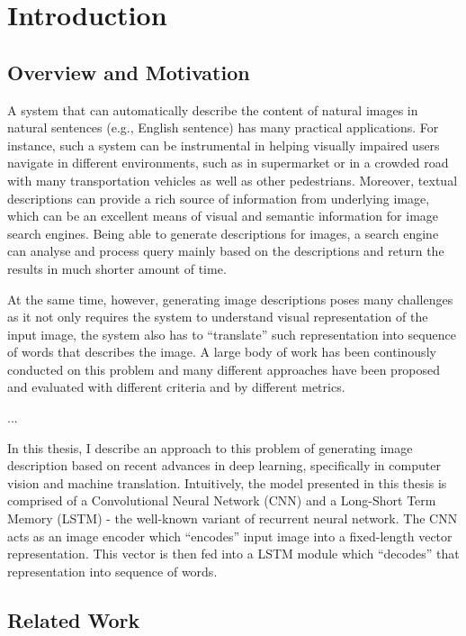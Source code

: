 \chapter{Introduction}

\section{Overview and Motivation}
A system that can automatically describe the content of natural images in natural sentences (e.g., English sentence) has many practical applications. For instance, such a system can be instrumental in helping visually impaired users navigate in different environments, such as in supermarket or in a crowded road with many transportation vehicles as well as other pedestrians. Moreover, textual descriptions can provide a rich source of information from underlying image, which can be an excellent means of visual and semantic information for image search engines. Being able to generate descriptions for images, a search engine can analyse and process query mainly based on the descriptions and return the results in much shorter amount of time.

At the same time, however, generating image descriptions poses many challenges as it not only requires the system to understand visual representation of the input image, the system also has to ``translate'' such representation into sequence of words that describes the image. A large body of work has been continously conducted on this problem and many different approaches have been proposed and evaluated with different criteria and by different metrics.

...

In this thesis, I describe an approach to this problem of generating image description based on recent advances in deep learning, specifically in computer vision and machine translation. Intuitively, the model presented in this thesis is comprised of a Convolutional Neural Network (CNN) and a Long-Short Term Memory (LSTM) - the well-known variant of recurrent neural network. The CNN acts as an image encoder which ``encodes'' input image into a fixed-length vector representation. This vector is then fed into a LSTM module which ``decodes'' that representation into sequence of words.

\section{Related Work}
